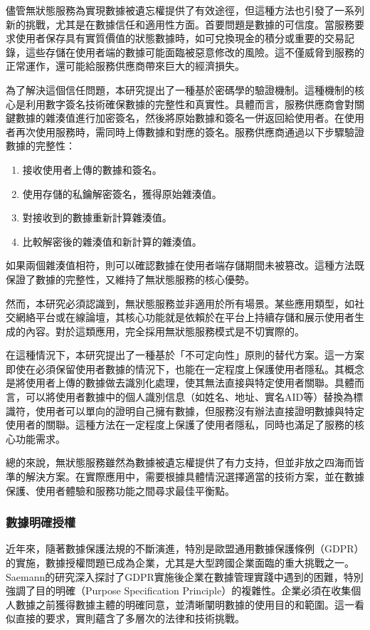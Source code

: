儘管無狀態服務為實現數據被遺忘權提供了有效途徑，但這種方法也引發了一系列新的挑戰，尤其是在數據信任和適用性方面。首要問題是數據的可信度。當服務要求使用者保存具有實質價值的狀態數據時，如可兌換現金的積分或重要的交易記錄，這些存儲在使用者端的數據可能面臨被惡意修改的風險。這不僅威脅到服務的正常運作，還可能給服務供應商帶來巨大的經濟損失。

為了解決這個信任問題，本研究提出了一種基於密碼學的驗證機制。這種機制的核心是利用數字簽名技術確保數據的完整性和真實性。具體而言，服務供應商會對關鍵數據的雜湊值進行加密簽名，然後將原始數據和簽名一併返回給使用者。在使用者再次使用服務時，需同時上傳數據和對應的簽名。服務供應商通過以下步驟驗證數據的完整性：
\begin{enumerate}
  \item 接收使用者上傳的數據和簽名。
  \item 使用存儲的私鑰解密簽名，獲得原始雜湊值。
  \item 對接收到的數據重新計算雜湊值。
  \item 比較解密後的雜湊值和新計算的雜湊值。
\end{enumerate}
如果兩個雜湊值相符，則可以確認數據在使用者端存儲期間未被篡改。這種方法既保證了數據的完整性，又維持了無狀態服務的核心優勢。

然而，本研究必須認識到，無狀態服務並非適用於所有場景。某些應用類型，如社交網絡平台或在線論壇，其核心功能就是依賴於在平台上持續存儲和展示使用者生成的內容。對於這類應用，完全採用無狀態服務模式是不切實際的。

在這種情況下，本研究提出了一種基於「不可定向性」原則的替代方案。這一方案即使在必須保留使用者數據的情況下，也能在一定程度上保護使用者隱私。其概念是將使用者上傳的數據做去識別化處理，使其無法直接與特定使用者關聯。具體而言，可以將使用者數據中的個人識別信息（如姓名、地址、實名AID等）替換為標識符，使用者可以單向的證明自己擁有數據，但服務沒有辦法直接證明數據與特定使用者的關聯。這種方法在一定程度上保護了使用者隱私，同時也滿足了服務的核心功能需求。

總的來說，無狀態服務雖然為數據被遺忘權提供了有力支持，但並非放之四海而皆準的解決方案。在實際應用中，需要根據具體情況選擇適當的技術方案，並在數據保護、使用者體驗和服務功能之間尋求最佳平衡點。
\subsubsection{數據明確授權}
近年來，隨著數據保護法規的不斷演進，特別是歐盟通用數據保護條例（GDPR）的實施，數據授權問題已成為企業，尤其是大型跨國企業面臨的重大挑戰之一。Saemann\cite{saemann2022investigating}的研究深入探討了GDPR實施後企業在數據管理實踐中遇到的困難，特別強調了目的明確（Purpose Specification Principle）的複雜性。企業必須在收集個人數據之前獲得數據主體的明確同意，並清晰闡明數據的使用目的和範圍。這一看似直接的要求，實則蘊含了多層次的法律和技術挑戰。

